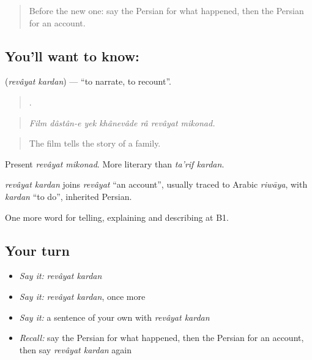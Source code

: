 \label{lesson:FA-C346-revayat-kardan}



\begin{quote}
Before the new one: say the Persian for what happened, then the Persian for an account.
\end{quote}

\subsection*{You'll want to know:  }
\textbf{ } (\emph{revâyat kardan}) — \textquotedblleft{}to narrate, to recount\textquotedblright{}.

\begin{quote}
      .
\end{quote}

\begin{quote}
\emph{Film dâstân-e yek khânevâde râ revâyat mikonad.}
\end{quote}

\begin{quote}
The film tells the story of a family.
\end{quote}

Present \emph{revâyat mikonad}. More literary than \emph{ta'rif kardan}.

\begin{cousinweb}
\emph{revâyat kardan} joins \emph{revâyat} \textquotedblleft{}an account\textquotedblright{}, usually traced to Arabic \emph{riwāya}, with \emph{kardan} \textquotedblleft{}to do\textquotedblright{}, inherited Persian.
\end{cousinweb}

\begin{grammarlens}[title={What you've built}]
One more word for telling, explaining and describing at B1.
\end{grammarlens}

\subsection*{Your turn}
\begin{itemize}
\raggedright
  \item \emph{Say it:} \emph{revâyat kardan}
  \item \emph{Say it:} \emph{revâyat kardan}, once more
  \item \emph{Say it:} a sentence of your own with \emph{revâyat kardan}
  \item \emph{Recall:} say the Persian for what happened, then the Persian for an account, then say \emph{revâyat kardan} again
\end{itemize}

